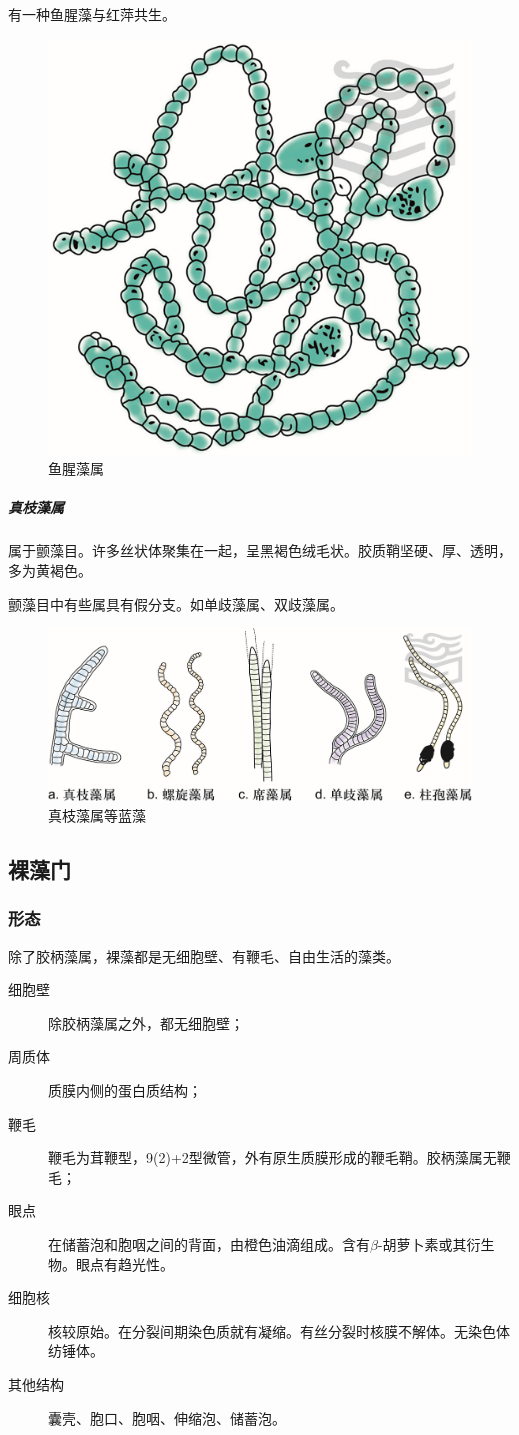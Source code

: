 有一种鱼腥藻与红萍共生。

\begin{figure}[htbp]
	\centering
	\includegraphics[width=0.3\linewidth]{Pics/鱼腥藻属}
	\caption{鱼腥藻属}
	\label{fig:anabeana}
\end{figure}


\subparagraph{真枝藻属}

属于颤藻目。许多丝状体聚集在一起，呈黑褐色绒毛状。胶质鞘坚硬、厚、透明，多为黄褐色。

\mbox{}

颤藻目中有些属具有假分支。如单歧藻属、双歧藻属。

\begin{figure}[htbp]
	\centering
	\includegraphics[width=0.7\linewidth]{Pics/真枝藻属等}
	\caption{真枝藻属等蓝藻}
	\label{fig:stigonema}
\end{figure}

\subsection{裸藻门}

\subsubsection{形态}

除了胶柄藻属，裸藻都是无细胞壁、有鞭毛、自由生活的藻类。
\begin{description}
	\item[细胞壁] 除胶柄藻属之外，都无细胞壁；
	\item[周质体] 质膜内侧的蛋白质结构；
	\item[鞭毛] 鞭毛为茸鞭型，9(2)+2型微管，外有原生质膜形成的鞭毛鞘。胶柄藻属无鞭毛；
	\item[眼点] 在储蓄泡和胞咽之间的背面，由橙色油滴组成。含有$\beta$-胡萝卜素或其衍生物。眼点有趋光性。
	\item[细胞核] 核较原始。在分裂间期染色质就有凝缩。有丝分裂时核膜不解体。无染色体纺锤体。
	\item[其他结构] 囊壳、胞口、胞咽、伸缩泡、储蓄泡。
\end{description}

